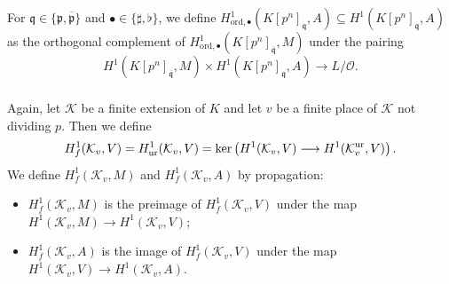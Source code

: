 \documentclass{amsart}
\numberwithin{equation}{section}
\newcommand{\frk}{\mathfrak}
\newcommand{\ord}{\mathrm{ord}}
\newcommand{\Iw}{\mathrm{Iw}}
\newcommand{\ur}{\textup{ur}}
\begin{document}
For $\frk{q}\in\lbrace \frk{p},\overline{\frk{p}}\rbrace$ and $\bullet\in\lbrace \sharp,\flat\rbrace$, 
we define $H^1_{\ord,\bullet}(K[p^n]_{\frk{q}},A)\subseteq H^1(K[p^n]_{\frk{q}},A)$ as the orthogonal complement of $H^1_{\ord,\bullet}(K[p^n]_{\overline{\frk{q}}},M)$ under the pairing
\begin{equation*}
    H^1(K[p^n]_{\overline{\frk{q}}},M)\times H^1(K[p^n]_{\frk{q}},A) \longrightarrow L/\mathcal{O}.
\end{equation*}

\subsubsection{} Again, let $\mathcal{K}$ be a finite extension of $K$ and let $v$ be a finite place of $\mathcal{K}$ not dividing $p$. Then we define
\[
H^1_f(\mathcal{K}_v,V)=H^1_{\ur}(\mathcal{K}_v,V)=\ker\left(H^1(\mathcal{K}_v,V)\longrightarrow H^1(\mathcal{K}_v^{\ur},V)\right).
\]
We define $H^1_f(\mathcal{K}_v,M)$ and $H^1_f(\mathcal{K}_v,A)$ by propagation:
\begin{itemize}
    \item $H^1_f(\mathcal{K}_v,M)$ is the preimage of $H^1_f(\mathcal{K}_v,V)$ under the map $H^1(\mathcal{K}_v,M)\rightarrow H^1(\mathcal{K}_v,V)$;
    \item $H^1_f(\mathcal{K}_v,A)$ is the image of $H^1_f(\mathcal{K}_v,V)$ under the map $H^1(\mathcal{K}_v,V)\rightarrow H^1(\mathcal{K}_v,A)$.
\end{itemize}
\end{document}
